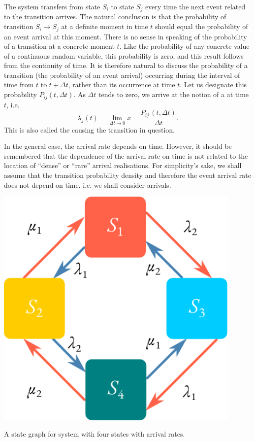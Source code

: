 The system transfers from state $S_{i}$ to state $S_{j}$ every time
the next event related to the transition arrives. The natural
conclusion is that the probability of transition $S_{i} \to S_{j}$ at
a definite moment in time $t$ should equal the probability of an event
arrival at this moment. There is no sense in speaking of the
probability of a transition at a concrete moment $t$. Like the
probability of any concrete value of a continuous random variable,
this probability is zero, and this result follows from the continuity
of time. It is therefore natural to discuss the probability of a
transition (the probability of an event arrival) occurring during the
interval of time from $t$ to $t+ \Delta t$, rather than its occurrence
at time $t$. Let us designate this probability $P_{ij}(t, \Delta
t)$. As $\Delta t$ tends to zero, we arrive at the notion of a
 at time $t$, i.e. 
\begin{equation}%
\lambda_{j} (t) = \lim_{\Delta t \rightarrow 0} x =  \frac{P_{ij}\,(
  t, \Delta t)}{\Delta t}.
\label{eq-2.1}
\end{equation}
This is also called the  causing the transition in
question.

In the general case, the arrival rate depends on time. However, it should
be remembered that the dependence of the arrival rate on time is
not related to the location of ``dense'' or ``rare'' arrival realisations. For
simplicity's sake, we shall assume that the transition probability density
and therefore the event arrival rate does not depend on time. i.e. we
shall consider  arrivals.


 \begin{marginfigure}[-1cm]%
 \centering
 \includegraphics[width=0.9\textwidth]{figures/state-graph2.pdf}
\caption{A state graph for system with four states with arrival rates.
\label{state-graph2}}
 \end{marginfigure}
 
